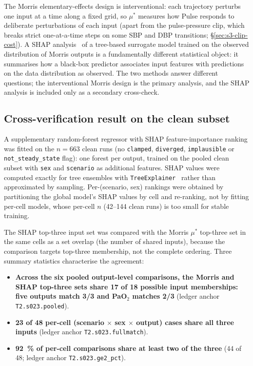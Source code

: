 \documentclass[pdflatex,sn-nature]{sn-jnl}%
\begin{document}
The Morris elementary-effects design is interventional: each trajectory perturbs one input at a time along a fixed grid, so $\mu^{*}$ measures how Pulse responds to deliberate perturbations of each input (apart from the pulse-pressure clip, which breaks strict one-at-a-time steps on some SBP and DBP transitions; \S\ref{sec:s3-clip-cost}). A SHAP analysis~\cite{lundberg2017} of a tree-based surrogate model trained on the observed distribution of Morris outputs is a fundamentally different statistical object: it summarises how a black-box predictor associates input features with predictions on the data distribution as observed. The two methods answer different questions; the interventional Morris design is the primary analysis, and the SHAP analysis is included only as a secondary cross-check.

\subsection{Cross-verification result on the clean subset}\label{sec:s13-result}

A supplementary random-forest regressor with SHAP feature-importance ranking was fitted on the $n = 663$ clean runs (no \texttt{clamped}, \texttt{diverged}, \texttt{implausible} or \texttt{not\_steady\_state} flag): one forest per output, trained on the pooled clean subset with \texttt{sex} and \texttt{scenario} as additional features. SHAP values were computed exactly for tree ensembles with \texttt{TreeExplainer}~\cite{lundberg2020tree} rather than approximated by sampling. Per-(scenario, sex) rankings were obtained by partitioning the global model's SHAP values by cell and re-ranking, not by fitting per-cell models, whose per-cell $n$ (42--144 clean runs) is too small for stable training.

The SHAP top-three input set was compared with the Morris $\mu^{*}$ top-three set in the same cells as a set overlap (the number of shared inputs), because the comparison targets top-three membership, not the complete ordering. Three summary statistics characterise the agreement:

\begin{itemize}
\item \textbf{Across the six pooled output-level comparisons, the Morris and SHAP top-three sets share 17 of 18 possible input memberships: five outputs match 3/3 and PaO$_2$ matches 2/3} (ledger anchor \texttt{T2.s023.pooled}).
\item \textbf{23 of 48 per-cell (scenario $\times$ sex $\times$ output) cases share all three inputs} (ledger anchor \texttt{T2.s023.fullmatch}).
\item \textbf{92~\% of per-cell comparisons share at least two of the three} (44 of 48; ledger anchor \texttt{T2.s023.ge2\_pct}).
\end{itemize}
\end{document}
